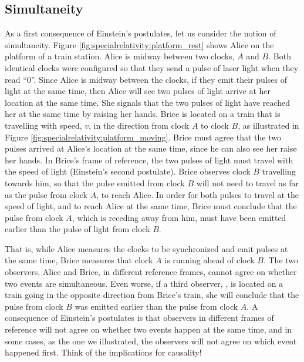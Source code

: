 \subsection{Simultaneity}
As a first consequence of Einstein's postulates, let us consider the notion of simultaneity. Figure \ref{fig:specialrelativity:platform_rest} shows Alice on the platform of a train station. Alice is midway between two clocks, $A$ and $B$. Both identical clocks were configured so that they send a pulse of laser light when they read ``0''. Since Alice is midway between the clocks, if they emit their pulses of light at the same time, then Alice will see two pulses of light arrive at her location at the same time. She signals that the two pulses of light have reached her at the same time by raising her hands. 
Brice is located on a train that is travelling with speed, $v$, in the direction from clock $A$ to clock $B$, as illustrated in Figure \ref{fig:specialrelativity:platform_moving}.
Brice must agree that the two pulses arrived at Alice's location at the same time, since he can also see her raise her hands. In Brice's frame of reference, the two pulses of light must travel with the speed of light (Einstein's second postulate). Brice observes clock $B$ travelling towards him, so that the pulse emitted from clock $B$ will not need to travel as far as the pulse from clock $A$, to reach Alice. In order for both pulses to travel at the speed of light, and to reach Alice at the same time, Brice must conclude that the pulse from clock $A$, which is receding away from him, must have been emitted earlier than the pulse of light from clock $B$.

That is, while Alice measures the clocks to be synchronized and emit pulses at the same time, Brice measures that clock $A$ is running ahead of clock $B$. The two observers, Alice and Brice, in different reference frames, cannot agree on whether two events are simultaneous. Even worse, if a third observer, \chloens, is located on a train going in the opposite direction from Brice's train, she will conclude that the pulse from clock $B$ was emitted earlier than the pulse from clock $A$. A consequence of Einstein's postulates is that observers in different frames of reference will not agree on whether two events happen at the same time, and in some cases, as the one we illustrated, the observers will not agree on which event happened first. Think of the implications for causality!

